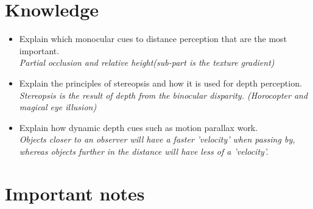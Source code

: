 \documentclass{article}
\begin{document}
\section{Knowledge}
\begin{itemize}
  \item Explain which monocular cues to distance perception that are the most important.\\
    \textit{Partial occlusion and relative height(sub-part is the texture gradient)}
  \item Explain the principles of stereopsis and how it is used for depth perception.\\
    \textit{Stereopsis is the result of depth from the binocular disparity. (Horocopter and magical eye illusion)}
  \item Explain how dynamic depth cues such as motion parallax work.\\
    \textit{Objects closer to an observer will have a faster 'velocity' when passing by, whereas objects further in the distance will have less of a 'velocity'.}
\end{itemize}

\section{Important notes}
\end{document}
